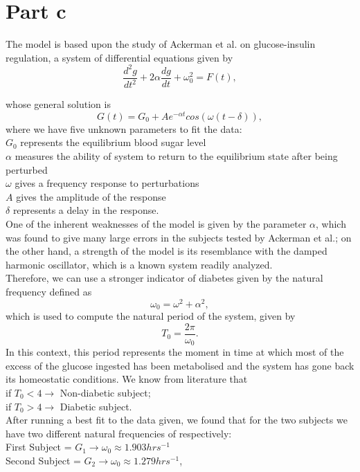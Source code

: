 \section{Part c}
The model is based upon the study of Ackerman et al. on glucose-insulin regulation, a system of differential equations given by
$$
\frac{d^{2}g}{dt^{2}} + 2\alpha\frac{dg}{dt} + \omega_{0}^{2} = F(t),
$$

whose general solution is
$$
G(t) = G_{0} + Ae^{-\alpha t}cos(\omega(t-\delta)),
$$
where we have five unknown parameters to fit the data:\\

$G_{0}$ represents the equilibrium blood sugar level\\
$\alpha$ measures the ability of system to return to the equilibrium state after being perturbed\\
$\omega$ gives a frequency response to perturbations\\
$A$ gives the amplitude of the response\\
$\delta$ represents a delay in the response.\\

One of the inherent weaknesses of the model is given by the parameter $\alpha$, which was found to give many large errors in the subjects tested by Ackerman et al.; on the other hand, a strength of the model is its resemblance with the damped harmonic oscillator, which is a known system readily analyzed.\\ 
Therefore, we can use a stronger indicator of diabetes given by the natural frequency defined as
$$
\omega_{0} = \omega^{2} + \alpha^{2},
$$
which is used to compute the natural period of the system, given by
$$
T_{0}= \frac{2\pi}{\omega_{0}}.
$$
In this context, this period represents the moment in time at which most of the excess of the glucose ingested has been metabolised and the system has gone back its homeostatic conditions. We know from literature that\\

if $T_{0} < 4 \rightarrow$ Non-diabetic subject;\\
if $T_{0} > 4 \rightarrow$ Diabetic subject.\\

After running a best fit to the data given, we found that for the two subjects we have two different natural frequencies of respectively:\\

First Subject = $G_{1} \longrightarrow \omega_{0} \approx 1.903 hrs^{-1}$\\
Second Subject = $G_{2} \longrightarrow \omega_{0} \approx 1.279 hrs^{-1}$,\\

